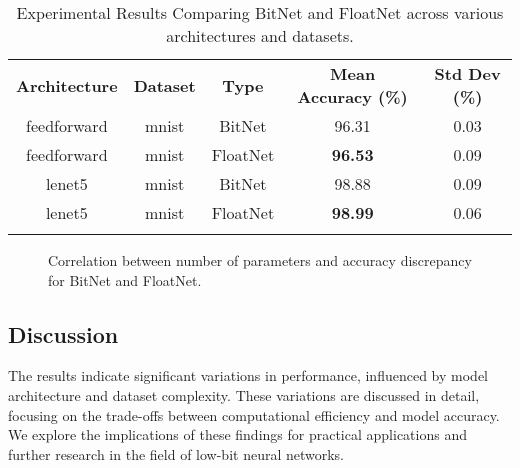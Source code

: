 \documentclass{article}
\begin{document}
\begin{table}[h]
\centering
\begin{tabular}{|c|c|c|c|c|}
\Xhline{2\arrayrulewidth}
\textbf{Architecture} & \textbf{Dataset} & \textbf{Type} & \textbf{Mean Accuracy (\%)} & \textbf{Std Dev (\%)} \\
\Xhline{2\arrayrulewidth}
feedforward & mnist & BitNet & 96.31 & 0.03 \\
feedforward & mnist & FloatNet & \textbf{96.53} & 0.09 \\
\Xhline{2\arrayrulewidth}
lenet5 & mnist & BitNet & 98.88 & 0.09 \\
lenet5 & mnist & FloatNet & \textbf{98.99} & 0.06 \\
\Xhline{2\arrayrulewidth}
\end{tabular}
\caption{Experimental Results Comparing BitNet and FloatNet across various architectures and datasets.}
\label{tab:results}
\end{table}

\begin{figure}[h]
\centering
{}
\caption{Correlation between number of parameters and accuracy discrepancy for BitNet and FloatNet.}
\label{fig:discrepancy_plot}
\end{figure}


\subsection{Discussion}

The results indicate significant variations in performance, influenced by model architecture and dataset complexity. These variations are discussed in detail, focusing on the trade-offs between computational efficiency and model accuracy. We explore the implications of these findings for practical applications and further research in the field of low-bit neural networks.





\end{document}

